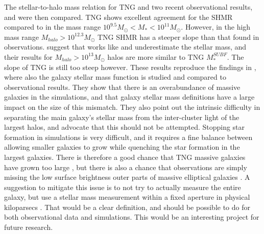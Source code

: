 The stellar-to-halo mass relation for TNG and two recent observational results, \textcite{Behroozi2019} and \textcite{Kravtsov2018} were then compared. TNG shows excellent agreement for the SHMR compared to \textcite{Behroozi2019} in the mass range $10^{9.5} M_\odot < M_\ast < 10^{11} M_\odot$. However, in the high mass range $M_{halo} > 10^{12.3} M_\odot$ TNG SHMR has a steeper slope than that found in observations. \textcite{Kravtsov2018} suggest that works like \textcite{Behroozi2019} and \textcite{Zanisi2019} underestimate the stellar mass, and their results for $M_{halo} > 10^{13} M_\odot$ halos are more similar to TNG $M^{SUBF}_\ast$. The slope of TNG is still too steep however. These results reproduce the findings in \textcite{Pillepich2017}, where also the galaxy stellar mass function is studied and compared to observational results. They show that there is an overabundance of massive galaxies in the simulations, and that galaxy stellar mass definitions have a large impact on the size of this mismatch. They also point out the intrinsic difficulty in separating the main galaxy's stellar mass from the inter-cluster light of the largest halos, and advocate that this should not be attempted. Stopping star formation in simulations is very difficult, and it requires a fine balance between allowing smaller galaxies to grow while quenching the star formation in the largest galaxies. There is therefore a good chance that TNG massive galaxies have grown too large \parencite[as suggested by][]{Vazquez2020}, but there is also a chance that observations are simply missing the low surface brightness outer parts of massive elliptical galaxies \parencite[see e.g.,][]{DSouza2015}. A suggestion to mitigate this issue is to not try to actually measure the entire galaxy, but use a stellar mass measurement within a fixed aperture in physical kiloparsecs \parencite[see e.g.,][]{Pillepich2017, Kravtsov2018}. That would be a clear definition, and should be possible to do for both observational data and simulations. This would be an interesting project for future research.



